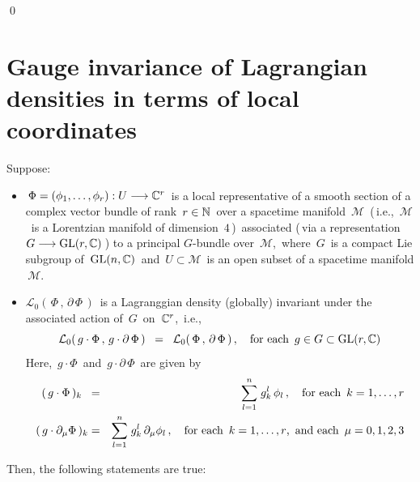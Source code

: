 \qed


\vskip 0.5cm
\section{Gauge invariance of Lagrangian densities in terms of local coordinates}


\begin{proposition}
\mbox{}
\vskip 0.05cm
\noindent
Suppose:
\begin{itemize}
\item
	\,$\Phi = \left(\phi_{1},\ldots,\phi_{r}\right) :U \longrightarrow \mathbb{C}^{r}$\,
	is a {\color{red}local representative} of a smooth section
	of a complex vector bundle of rank \,$r \in \mathbb{N}$\,
	over a spacetime manifold \,$\mathcal{M}$\,
	(\,i.e., \,$\mathcal{M}$\, is a Lorentzian manifold of dimension \,$4$\,)\,
	associated (\,via a representation \,$G \longrightarrow \textnormal{GL}(r,\mathbb{C})$\,)
	to a principal $G$-bundle over \,$\mathcal{M}$,\,
	where \,$G$\, is a compact Lie subgroup of \,$\textnormal{GL}(n,\mathbb{C})$\, and
	\,$U \subset \mathcal{M}$\, is an open subset of a spacetime manifold \,$\mathcal{M}$.\,
\item
    $\mathcal{L}_{0}\!\left(\,\Phi\,,\,\partial\,\Phi\,\right)$\,
    is a Lagranggian density {\color{red}(globally) invariant}
    under the associated action of \,$G$\, on \,$\mathbb{C}^{r}$,\, i.e.,
    \begin{equation*}
    \mathcal{L}_{0}\!\left(\,g\cdot\Phi\,,\,g\cdot\partial\,\Phi\,\right)
    \;\; = \;\;
        \mathcal{L}_{0}\!\left(\,\Phi\,,\,\partial\,\Phi\,\right),
    \quad
    \textnormal{for each \,$g \in G \subset \textnormal{GL}(r,\mathbb{C})$}
    \end{equation*}
    Here,
    \,$g \cdot \Phi$\, and \,$g \cdot \partial\,\Phi$\,
    are given by
    \begin{eqnarray*}
    (\,g\cdot\Phi\,)_{k}
    {\color{white}..}
    & = &
        \overset{n}{\underset{l=1}{\sum}}\;
        g_{k}^{l}\,\phi_{l}\,,
    \quad\textnormal{for each \,$k = 1, \ldots, r$}
    \\
    (\,g\cdot\partial_{\mu}\Phi\,)_{k}
    & = &
        \overset{n}{\underset{l=1}{\sum}}\;
        g_{k}^{l}\,\partial_{\mu}\phi_{l}\,,
    \quad\textnormal{for each \,$k = 1, \ldots, r$,\, and each \,$\mu = 0,1,2,3$}
    \end{eqnarray*}
\end{itemize}
Then, the following statements are true:

\end{proposition}
